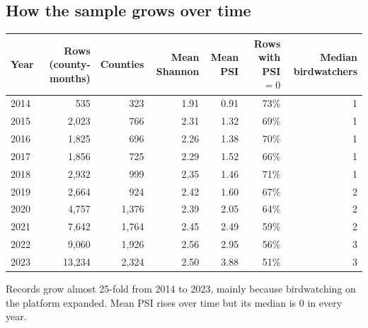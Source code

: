 \documentclass[10pt]{article}
\begin{document}
\subsection*{How the sample grows over time}
\begin{table}[H]\centering\small
\begin{tabular}{lrrrrrr}
\toprule
Year & Rows (county-months) & Counties & Mean Shannon & Mean PSI & Rows with PSI $=0$ & Median birdwatchers\\
\midrule
2014 & 535 & 323 & 1.91 & 0.91 & 73\% & 1\\
2015 & 2,023 & 766 & 2.31 & 1.32 & 69\% & 1\\
2016 & 1,825 & 696 & 2.26 & 1.38 & 70\% & 1\\
2017 & 1,856 & 725 & 2.29 & 1.52 & 66\% & 1\\
2018 & 2,932 & 999 & 2.35 & 1.46 & 71\% & 1\\
2019 & 2,664 & 924 & 2.42 & 1.60 & 67\% & 2\\
2020 & 4,757 & 1,376 & 2.39 & 2.05 & 64\% & 2\\
2021 & 7,642 & 1,764 & 2.45 & 2.49 & 59\% & 2\\
2022 & 9,060 & 1,926 & 2.56 & 2.95 & 56\% & 3\\
2023 & 13,234 & 2,324 & 2.50 & 3.88 & 51\% & 3\\
\bottomrule
\end{tabular}
\end{table}
\noindent Records grow almost 25-fold from 2014 to 2023, mainly because birdwatching on the platform expanded. Mean PSI rises over time but its median is 0 in every year.
\end{document}
